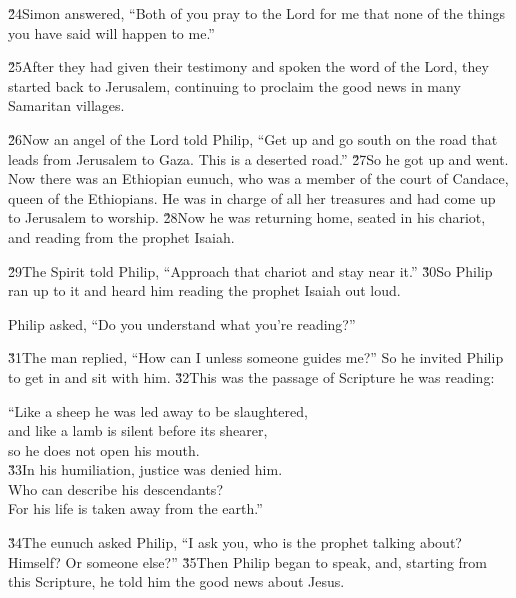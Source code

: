 \v{24}Simon answered, ``Both of you pray to the Lord for me that none of the things you have said will happen to me.''

\v{25}After they had given their testimony and spoken the word of the Lord, they started back to Jerusalem, continuing to proclaim the good news in many Samaritan villages.

\v{26}Now an angel of the Lord told Philip, ``Get up and go south on the road that leads from Jerusalem to Gaza. This is a deserted road.'' \v{27}So he got up and went. Now there was an Ethiopian eunuch, who was a member of the court of Candace, queen of the Ethiopians. He was in charge of all her treasures and had come up to Jerusalem to worship. \v{28}Now he was returning home, seated in his chariot, and reading from the prophet Isaiah.

\v{29}The Spirit told Philip, ``Approach that chariot and stay near it.'' \v{30}So Philip ran up to it and heard him reading the prophet Isaiah out loud.

Philip asked, ``Do you understand what you're reading?''

\v{31}The man replied, ``How can I unless someone guides me?'' So he invited Philip to get in and sit with him. \v{32}This was the passage of Scripture he was reading:

\begin{poetry}
\poeml ``Like a sheep he was led away to be slaughtered, \\
\poemll    and like a lamb is silent before its shearer, \\
\poemlll       so he does not open his mouth. \\
\poeml \v{33}In his humiliation, justice was denied him. \\
\poemll    Who can describe his descendants? \\
\poemlll       For his life is taken away from the earth.''
\end{poetry}

\v{34}The eunuch asked Philip, ``I ask you, who is the prophet talking about? Himself? Or someone else?'' \v{35}Then Philip began to speak, and, starting from this Scripture, he told him the good news about Jesus.

